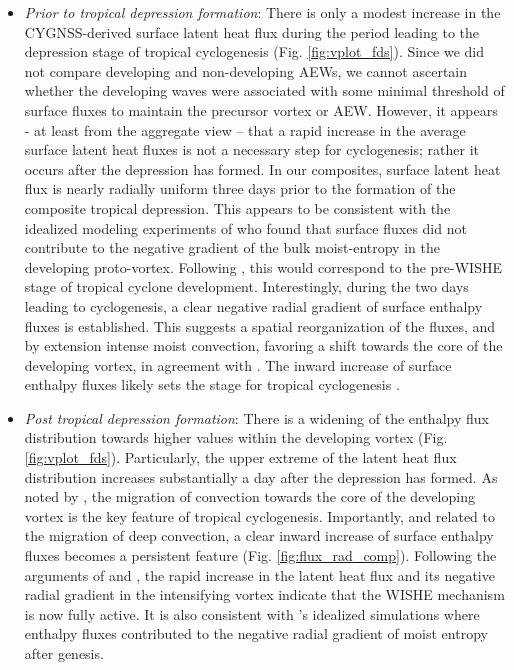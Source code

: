 \documentclass[draft]{agujournal2019}
\begin{document}
\begin{itemize}
    \item \emph{Prior to tropical depression formation}: There is only a modest increase in the CYGNSS-derived surface latent heat flux during the period leading to the depression stage of tropical cyclogenesis (Fig. \ref{fig:vplot_fds}).  Since we did not compare developing and non-developing AEWs, we cannot ascertain whether the developing waves were associated with some minimal threshold of surface fluxes to maintain the precursor vortex or AEW. However, it appears - at least from the aggregate view -- that a rapid increase in the average surface latent heat fluxes is not a necessary step for cyclogenesis; rather it occurs after the depression has formed.  In our composites, surface latent heat flux is nearly radially uniform three days prior to the formation of the composite tropical depression. This appears to be consistent with the idealized modeling experiments of  who found that surface fluxes did not contribute to the negative gradient of the bulk moist-entropy in the developing proto-vortex. Following  , this would correspond to the pre-WISHE stage of tropical cyclone development. Interestingly, during the two days leading to cyclogenesis, a clear negative radial gradient of surface enthalpy fluxes is established. This suggests a spatial reorganization of the fluxes, and by extension intense moist convection, favoring a shift towards the core of the developing vortex, in agreement with . The inward increase of surface enthalpy fluxes likely sets the stage for tropical cyclogenesis \cite{MB2018}. 

    \item \emph{Post tropical depression formation}: There is a widening of the enthalpy flux distribution towards higher values within the developing vortex (Fig. \ref{fig:vplot_fds}). Particularly, the upper extreme of the latent heat flux distribution increases substantially a day after the depression has formed. As noted by \cite{WZ2018}, the migration of convection towards the core of the developing vortex is the key feature of tropical cyclogenesis. Importantly, and related to the migration of deep convection, a clear inward increase of surface enthalpy fluxes becomes a persistent feature (Fig. \ref{fig:flux_rad_comp}). Following the arguments of  and , the rapid increase in the latent heat flux and its negative  radial gradient in the  intensifying vortex indicate that the WISHE mechanism is now fully active. It is also consistent with 's idealized simulations where enthalpy fluxes contributed to the negative radial gradient of moist entropy after genesis. 
\end{itemize}
\end{document}
